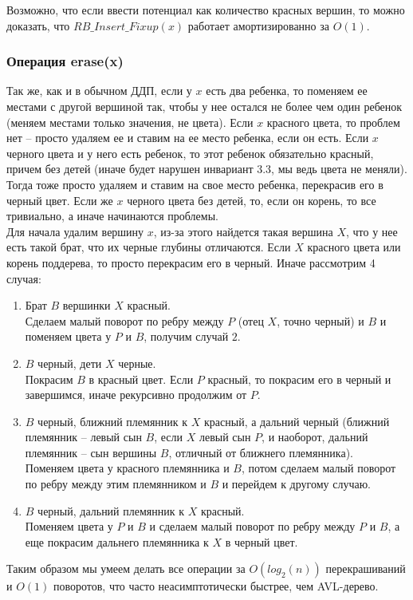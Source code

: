 \begin{note}
    Возможно, что если ввести потенциал как количество красных вершин, то можно доказать, что $RB\_Insert\_Fixup(x)$ работает амортизированно за $O(1)$.
\end{note}

\subsubsection{Операция erase(x)}

Так же, как и в обычном ДДП, если у $x$ есть два ребенка, то поменяем ее местами с другой вершиной так, чтобы у нее остался не более чем один ребенок (меняем местами только значения, не цвета). Если $x$ красного цвета, то проблем нет -- просто удаляем ее и ставим на ее место ребенка, если он есть. Если $x$ черного цвета и у него есть ребенок, то этот ребенок обязательно красный, причем без детей (иначе будет нарушен инвариант $3.3$, мы ведь цвета не меняли). Тогда тоже просто удаляем и ставим на свое место ребенка, перекрасив его в черный цвет. Если же $x$ черного цвета без детей, то, если он корень, то все тривиально, а иначе начинаются проблемы. \\
Для начала удалим вершину $x$, из-за этого найдется такая вершина $X$, что у нее есть такой брат, что их черные глубины отличаются. Если $X$ красного цвета или корень поддерева, то просто перекрасим его в черный. Иначе рассмотрим 4 случая:

\begin{enumerate}
    \item Брат $B$ вершинки $X$ красный. \\
    Сделаем малый поворот по ребру между $P$ (отец $X$, точно черный) и $B$ и поменяем цвета у $P$ и $B$, получим случай $2$.
    \item $B$ черный, дети $X$ черные. \\
    Покрасим $B$ в красный цвет. Если $P$ красный, то покрасим его в черный и завершимся, иначе рекурсивно продолжим от $P$.
    \item $B$ черный, ближний племянник к $X$ красный, а дальний черный (ближний племянник -- левый сын $B$, если $X$ левый сын $P$, и наоборот, дальний племянник -- сын вершины $B$, отличный от ближнего племянника). \\
    Поменяем цвета у красного племянника и $B$, потом сделаем малый поворот по ребру между этим племянником и $B$ и перейдем к другому случаю.
    \item $B$ черный, дальний племянник к $X$ красный. \\
    Поменяем цвета у $P$ и $B$ и сделаем малый поворот по ребру между $P$ и $B$, а еще покрасим дальнего племянника к $X$ в черный цвет.
\end{enumerate}

Таким образом мы умеем делать все операции за $O(log_2(n))$ перекрашиваний и $O(1)$ поворотов, что часто неасимптотически быстрее, чем AVL-дерево.
